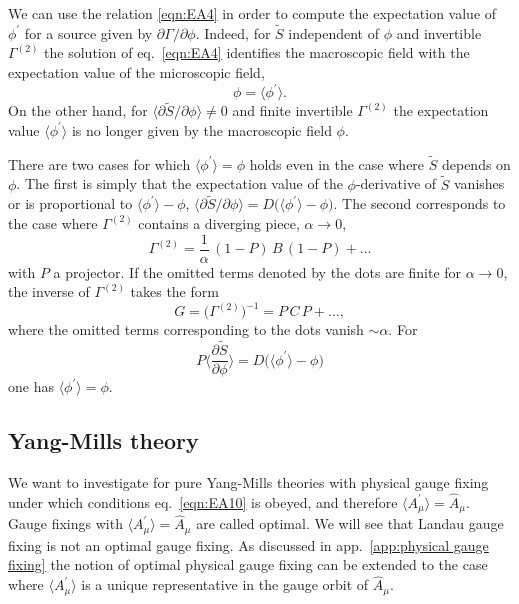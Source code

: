 \documentclass[twocolumn,aps,prd,amsmath,amssymb,preprintnumbers,longbibliography]{revtex4-1}
\numberwithin{equation}{section}
\newcounter{condition}[equation]
\begin{document}
\begin{appendices}
We can use the relation \eqref{eqn:EA4} in order to compute the expectation value of $\phi^\prime$ for a source given by $\partial \Gamma/\partial \phi$. Indeed, for $\tilde{S}$ independent of $\phi$ and invertible $\Gamma^{(2)}$ the solution of eq.~\eqref{eqn:EA4} identifies the macroscopic field with the expectation value of the microscopic field,
\begin{equation}\label{eqn:EA7}
	\phi
	= \langle\phi^\prime\rangle.
\end{equation}
On the other hand, for $\langle\partial \tilde{S}/\partial \phi\rangle \neq 0$ and finite invertible $\Gamma^{(2)}$ the expectation value $\langle\phi^\prime\rangle$ is no longer given by the macroscopic field $\phi$.

There are two cases for which $\langle\phi^\prime\rangle = \phi$ holds even in the case where $\tilde{S}$ depends on $\phi$. The first is simply that the expectation value of the $\phi$-derivative of $\tilde{S}$ vanishes or is proportional to $\langle\phi^\prime\rangle - \phi$, $\langle\partial \tilde{S}/\partial \phi\rangle = D \bigl(\langle\phi^\prime\rangle - \phi\bigr)$. The second corresponds to the case where $\Gamma^{(2)}$ contains a diverging piece, $\alpha \to 0$,
\begin{equation}\label{eqn:EA8}
	\Gamma^{(2)}
	= \frac{1}{\alpha} \, (1 - P) \, B \, (1 - P) + \dots
\end{equation}
with $P$ a projector. If the omitted terms denoted by the dots are finite for $\alpha \to 0$, the inverse of $\Gamma^{(2)}$ takes the form
\begin{equation}\label{eqn:EA9}
	G
	= \bigl(\Gamma^{(2)}\bigr)^{-1}
	= P \, C \, P + \dots,
\end{equation}
where the omitted terms corresponding to the dots vanish $\sim \alpha$. For
\begin{equation}\label{eqn:EA10}
	P \biggl\langle\frac{\partial \tilde{S}}{\partial \phi}\biggr\rangle
	= D \bigl(\langle\phi^\prime\rangle - \phi\bigr)
\end{equation}
one has $\langle\phi^\prime\rangle = \phi$.


\subsection{Yang-Mills theory}

We want to investigate for pure Yang-Mills theories with physical gauge fixing under which conditions eq.~\eqref{eqn:EA10} is obeyed, and therefore $\langle A_\mu^\prime\rangle = \hat{A}_\mu$. Gauge fixings with $\langle A_\mu^\prime\rangle = \hat{A}_\mu$ are called optimal. We will see that Landau gauge fixing is not an optimal gauge fixing. As discussed in app.~\ref{app:physical gauge fixing} the notion of optimal physical gauge fixing can be extended to the case where $\langle A_\mu^\prime\rangle$ is a unique representative in the gauge orbit of $\hat{A}_\mu$.


\end{appendices}
\end{document}
